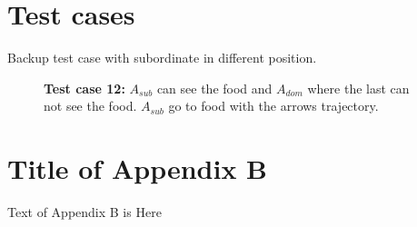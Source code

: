 \documentclass{article}
\begin{document}
\section{Test cases}\label{test.cases}
Backup test case with subordinate in different position.
\begin{figure}
    \centering
    \caption{\textbf {Test  case 12:} \(A_{sub}\) can see the food and \(A_{dom}\) where the last can not see the food. \(A_{sub}\) go to food with the arrows trajectory.}
    \label{fig.tc.12}
\end{figure}
\section{Title of Appendix B}

Text of Appendix B is Here
\end{document}

